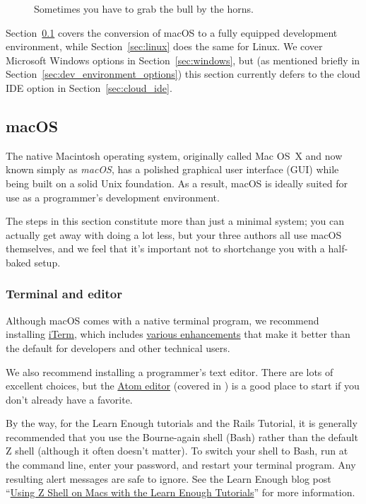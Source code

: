 \begin{figure}
\begin{center}
\end{center}
\caption{Sometimes you have to grab the bull by the horns.\label{fig:grab_bull_by_horns}}
\end{figure}

Section~\ref{sec:macos} covers the conversion of macOS to a fully equipped development environment, while Section~\ref{sec:linux} does the same for Linux. We cover Microsoft Windows options in Section~\ref{sec:windows}, but (as mentioned briefly in Section~\ref{sec:dev_environment_options}) this section currently defers to the cloud IDE option in Section~\ref{sec:cloud_ide}.


\subsection{macOS} %
\label{sec:macos}

The native Macintosh operating system, originally called Mac OS~X and now known simply as \emph{macOS}, has a polished graphical user interface (GUI) while being built on a solid Unix foundation. As a result, macOS is ideally suited for use as a programmer's development environment.

The steps in this section constitute more than just a minimal system; you can actually get away with doing a lot less, but your three authors all use macOS themselves, and we feel that it's important not to shortchange you with a half-baked setup.

\subsubsection{Terminal and editor} %
\label{sec:terminal_and_editor}

Although macOS comes with a native terminal program, we recommend installing \href{https://www.iterm2.com/downloads.html}{iTerm}, which includes \href{https://www.iterm2.com/features.html}{various enhancements} that make it better than the default for developers and other technical users.

We also recommend installing a programmer's text editor. There are lots of excellent choices, but the \href{https://atom.io/}{Atom editor} (covered in ) is a good place to start if you don't already have a favorite.

By the way, for the Learn Enough tutorials and the Rails Tutorial, it is generally recommended that you use the Bourne-again shell (Bash) rather than the default Z shell (although it often doesn't matter). To switch your shell to Bash, run  at the command line, enter your password, and restart your terminal program. Any resulting alert messages are safe to ignore. See the Learn Enough blog post ``\href{https://news.learnenough.com/macos-bash-zshell}{Using Z Shell on Macs with the Learn Enough Tutorials}'' for more information.

